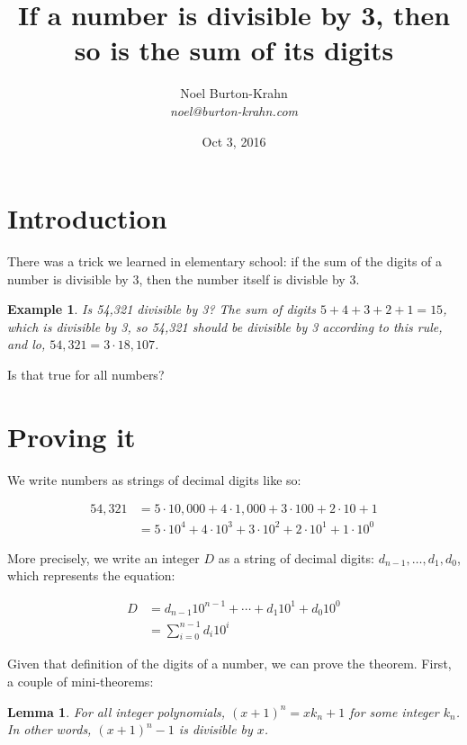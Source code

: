 \documentclass{article}
\newtheorem{lemma}{Lemma}
\newtheorem{example}{Example}
\begin{document}
\title{If a number is divisible by 3, then so is the sum of its digits}
\author{Noel Burton-Krahn \\ {\em noel@burton-krahn.com}}
\date{Oct 3, 2016}
\maketitle
\section{Introduction}

There was a trick we learned in elementary school: if the sum of the
digits of a number is divisible by 3, then the number itself is
divisble by 3.

\begin{example}
  Is 54,321 divisible by 3?  The sum of digits $5 + 4 + 3 + 2 + 1 = 15$,
  which is divisible by 3, so 54,321 should be divisible by 3
  according to this rule, and lo, $54,321 = 3 \cdot 18,107$.
\end{example}

Is that true for all numbers?

\section{Proving it}

We write numbers as strings of decimal digits like so:

\begin{align*}
  54,321 & = 5 \cdot 10,000 + 4 \cdot 1,000 + 3 \cdot 100 + 2 \cdot 10 + 1 \\
         & = 5 \cdot 10^4   + 4 \cdot 10^3 + 3 \cdot 10^2 + 2 \cdot 10^1 + 1 \cdot 10^0
\end{align*}

More precisely, we write an integer $D$ as a string of decimal digits:
$d_{n-1},{\ldots},d_1,d_0$, which represents the equation:

\begin{align*}
  D & = d_{n-1} 10^{n-1} + \cdots + d_1 10^1 + d_0 10^0 \\
    & = \sum_{i=0}^{n-1} d_i 10^i
\end{align*}

Given that definition of the digits of a number, we can prove the
theorem.  First, a couple of mini-theorems:

\pagebreak

\begin{lemma} 
For all integer polynomials, $(x+1)^n = x k_n + 1$ for some integer
$k_n$.  In other words, $(x+1)^n - 1$ is divisible by $x$.
\end{lemma}
\end{document}
